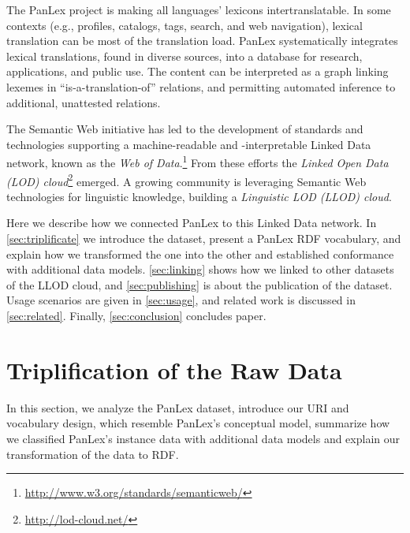 \documentclass[sw]{iosart2c}
\begin{document}
The PanLex project is making all languages' lexicons intertranslatable. In some contexts (e.g., profiles, catalogs, tags, search, and web navigation), lexical translation can be most of the translation load. PanLex systematically integrates lexical translations, found in diverse sources, into a database for research, applications, and public use. The content can be interpreted as a graph linking lexemes in ``is-a-translation-of'' relations, and permitting automated inference to additional, unattested relations.

The Semantic Web initiative has led to the development of standards and technologies
supporting a machine-readable and \mbox{-i}nter\-pretable Linked Data
network, known as the \emph{Web of Data}.\footnote{\url{http://www.w3.org/standards/semanticweb/}} From these efforts the \emph{Linked Open Data (LOD) cloud}\footnote{\url{http://lod-cloud.net/}} emerged.
A growing community is leveraging Semantic Web technologies for linguistic knowledge, building a \emph{Linguistic LOD (LLOD) cloud}.

Here we describe how we connected PanLex to this Linked Data network.
In \autoref{sec:triplificate} we introduce the dataset, present a
PanLex RDF vocabulary, and explain how we transformed the one into the other and established conformance with additional data models.
\autoref{sec:linking} shows how we linked to other datasets of the LLOD cloud,
and \autoref{sec:publishing} is about the publication of the dataset.
Usage scenarios are given in \autoref{sec:usage}, and related work is discussed in \autoref{sec:related}.
Finally, \autoref{sec:conclusion} concludes paper.

\section{Triplification of the Raw Data}
\label{sec:triplificate}
In this section, we analyze the PanLex dataset, introduce our URI and vocabulary design, which resemble PanLex's conceptual model,
summarize how we classified PanLex's instance data with additional data models and explain our transformation of the data to RDF.
\end{document}

